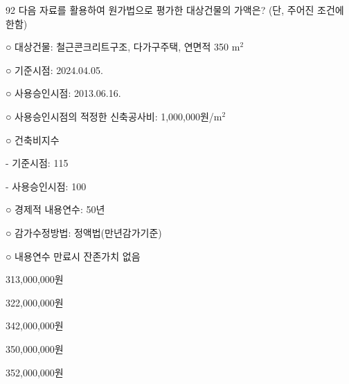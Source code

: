 \begin{question}{92}
다음 자료를 활용하여 원가법으로 평가한 대상건물의 가액은? (단, 주어진 조건에 한함)
\begin{framedtext}
○ 대상건물: 철근콘크리트구조, 다가구주택, 연면적 350 $\mathrm{m}^{2}$ \par
○ 기준시점: 2024.04.05. \par
○ 사용승인시점: 2013.06.16. \par
○ 사용승인시점의 적정한 신축공사비: 1,000,000원/$\mathrm{m}^{2}$ \par
○ 건축비지수 \par
\hspace*{1em}- 기준시점: 115 \par
\hspace*{1em}- 사용승인시점: 100 \par
○ 경제적 내용연수: 50년 \par
○ 감가수정방법: 정액법(만년감가기준) \par
○ 내용연수 만료시 잔존가치 없음 \par
\end{framedtext}
\begin{choices}
  \item 313,000,000원
  \item 322,000,000원
  \item 342,000,000원
  \item 350,000,000원
  \item 352,000,000원
\end{choices}
\end{question}

